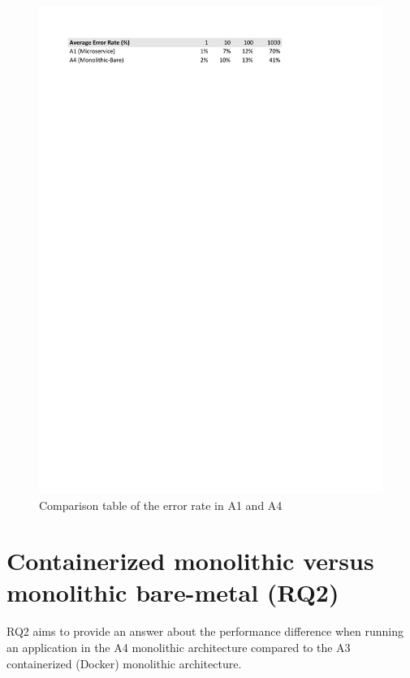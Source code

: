 \documentclass[a4paper,oneside]{bth}
\begin{document}
\begin{figure}[h]
\begin{center}
\includegraphics[trim={1cm 26cm 0 2cm},clip]{rq1-error}
\caption{Comparison table of the error rate in A1 and A4}
\label{rq1-error}
\end{center}
\end{figure}


\section{Containerized monolithic versus monolithic bare-metal (RQ2)}
RQ2 aims to provide an answer about the performance difference when running an application in the A4 monolithic architecture compared to the A3 containerized (Docker) monolithic architecture.
\end{document}
